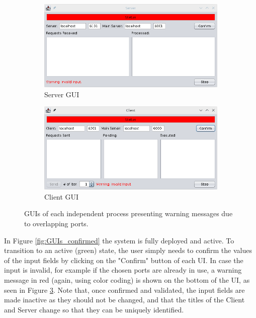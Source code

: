 \documentclass[12pt]{article}
\begin{document}
\begin{figure}[H]
  \centering
  \begin{subfigure}{.5\textwidth}
    \centering
    \includegraphics[width=.95\linewidth]{img/S_wrong.png}
    \caption{Server GUI}
    \label{fig:S_wrong}
  \end{subfigure}%
  \begin{subfigure}{.5\textwidth}
    \centering
    \includegraphics[width=.95\linewidth]{img/C_wrong.png}
    \caption{Client GUI}
    \label{fig:C_wrong}
  \end{subfigure}
  \caption{GUIs of each independent process presenting warning messages due to overlapping ports.}
  \label{fig:GUIs_wrong}
\end{figure} 

In Figure \ref{fig:GUIs_confirmed} the system is fully deployed and active.
To transition to an active (green) state, the user simply needs to confirm the values of the input fields by clicking on the "Confirm" button of each UI.
In case the input is invalid, for example if the chosen ports are already in use, a warning message in red (again, using color coding) is shown on the bottom of
the UI, as seen in Figure \ref{fig:GUIs_wrong}.
Note that, once confirmed and validated, the input fields are made inactive as they should not be changed, and that the titles of the Client and Server change 
so that they can be uniquely identified.
\end{document}
